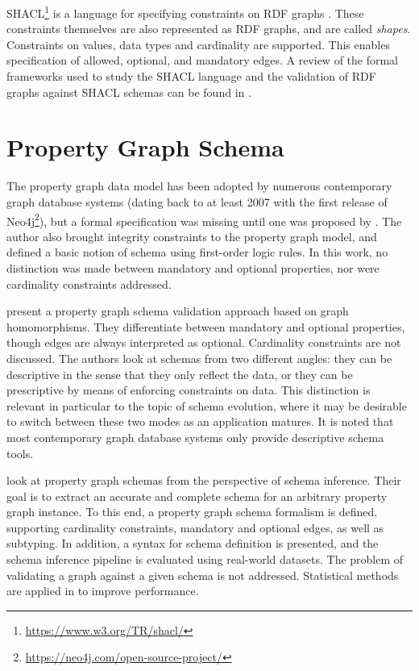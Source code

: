\documentclass{report}
\theoremstyle{definition}
\begin{document}
SHACL\footnote{\url{https://www.w3.org/TR/shacl/}} is a language for specifying constraints on RDF graphs \citep{pan2009rdf}. These constraints themselves are also represented as RDF graphs, and are called \emph{shapes}. Constraints on values, data types and cardinality are supported. This enables specification of allowed, optional, and mandatory edges. A review of the formal frameworks used to study the SHACL language and the validation of RDF graphs against SHACL schemas can be found in \citet{pareti2022shacl}.

\section{Property Graph Schema}

The property graph data model has been adopted by numerous contemporary graph database systems (dating back to at least 2007 with the first release of Neo4j\footnote{\url{https://neo4j.com/open-source-project/}}), but a formal specification was missing until one was proposed by \citet{angles2018property}. The author also brought integrity constraints to the property graph model, and defined a basic notion of schema using first-order logic rules. In this work, no distinction was made between mandatory and optional properties, nor were cardinality constraints addressed.

\citet{bonifati2019schema} present a property graph schema validation approach based on graph homomorphisms. They differentiate between mandatory and optional properties, though edges are always interpreted as optional. Cardinality constraints are not discussed. The authors look at schemas from two different angles: they can be descriptive in the sense that they only reflect the data, or they can be prescriptive by means of enforcing constraints on data. This distinction is relevant in particular to the topic of schema evolution, where it may be desirable to switch between these two modes as an application matures. It is noted that most contemporary graph database systems only provide descriptive schema tools.

\citet{lbath2021inference} look at property graph schemas from the perspective of schema inference. Their goal is to extract an accurate and complete schema for an arbitrary property graph instance. To this end, a property graph schema formalism is defined, supporting cardinality constraints, mandatory and optional edges, as well as subtyping. In addition, a syntax for schema definition is presented, and the schema inference pipeline is evaluated using real-world datasets. The problem of validating a graph against a given schema is not addressed. Statistical methods are applied in \citep{bonifati2022hierarchical} to improve performance.
\end{document}
